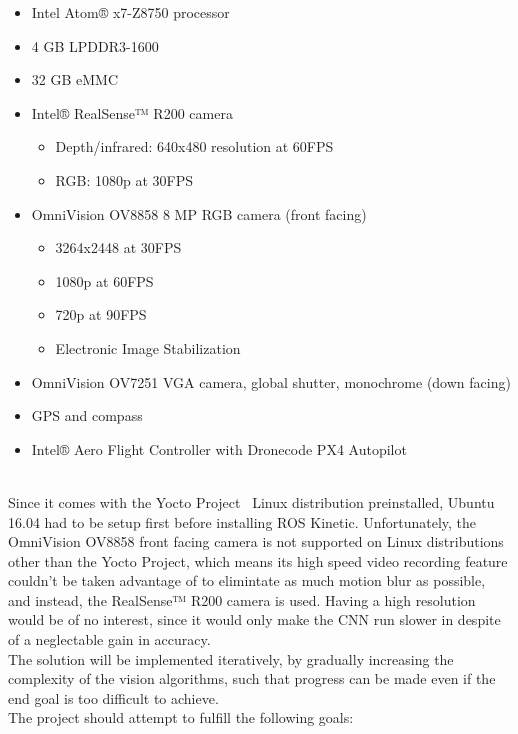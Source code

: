 \begin{itemize}
	\item{Intel Atom® x7-Z8750 processor}
	\item{4 GB LPDDR3-1600}
	\item{32 GB eMMC}
	\item{Intel® RealSense™ R200 camera}
		\begin{itemize}
			\item{Depth/infrared: 640x480 resolution at 60FPS}
			\item{RGB: 1080p at 30FPS}
		\end{itemize}
	\item{OmniVision OV8858 8 MP RGB camera (front facing)}
		\begin{itemize}
			\item{3264x2448 at 30FPS}
			\item{1080p at 60FPS}
			\item{720p at 90FPS}
			\item{Electronic Image Stabilization}
		\end{itemize}
	\item{OmniVision OV7251 VGA camera, global shutter, monochrome (down facing)}
	\item{GPS and compass}
	\item{Intel® Aero Flight Controller with Dronecode PX4 Autopilot}
\end{itemize}

~\\Since it comes with the Yocto Project~\cite{Yocto} Linux distribution preinstalled, Ubuntu
16.04 had to be setup first before installing ROS Kinetic. Unfortunately, the
OmniVision OV8858 front facing camera is not supported on Linux distributions
other than the Yocto Project, which means its high speed video recording feature
couldn't be taken advantage of to elimintate as much motion blur as possible,
and instead, the RealSense™ R200 camera is used. Having a high resolution would
be of no interest, since it would only make the CNN run slower in despite of a
neglectable gain in accuracy.\\


The solution will be implemented iteratively, by gradually increasing the
complexity of the vision algorithms, such that progress can be made even if the
end goal is too difficult to achieve.\\

The project should attempt to fulfill the following goals:

